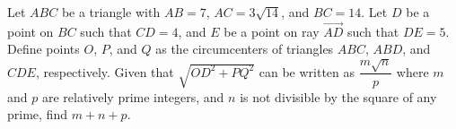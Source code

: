 Let $ABC$ be a triangle with $AB=7$, $AC=3\sqrt{14}$, and $BC=14$. Let $D$ be a point on $BC$ such that $CD=4$, and $E$ be a point on ray $\overrightarrow{AD}$ such that $DE=5$. Define points $O$, $P$, and $Q$ as the circumcenters of triangles $ABC$, $ABD$, and $CDE$, respectively. Given that $\sqrt{OD^2+PQ^2}$ can be written as $\dfrac{m\sqrt{n}}{p}$ where $m$ and $p$ are relatively prime integers, and $n$ is not divisible by the square of any prime, find $m+n+p$.
